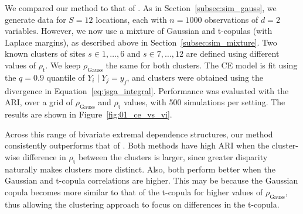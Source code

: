 \documentclass[12pt]{article}
\newcommand{\JSGa}{\mathop{\mathrm{JS}^{\mathrm{G}_{\lambda}}}\nolimits}
\newcommand{\rhou}[1]{\rho_{\text{#1}}}
\begin{document}
We compared our method to that of \citet{Vignotto2021}.
As in Section~\ref{subsec:sim_gauss}, we generate data for $S = 12$ locations, each with $n = 1000$ observations of $d = 2$ variables.
However, we now use a mixture of Gaussian and t-copulas (with Laplace margins), as described above in Section~\ref{subsec:sim_mixture}. 
Two known clusters of sites $s \in {1, \ldots, 6}$ and $s \in {7, \ldots, 12}$ are defined using different values of $\rhou{t}$. 
We keep $\rhou{Gauss}$ the same for both clusters.
The CE model is fit using the $q = 0.9$ quantile of $Y_{i} \mid Y_{j} = y_j$, and clusters were obtained using the divergence in Equation~\eqref{eq:jsga_integral}.
Performance was evaluated with the ARI, over a grid of $\rhou{Gauss}$ and $\rhou{t}$ values, with 500 simulations per setting.
The results are shown in Figure~\ref{fig:01_ce_vs_vi}. 

Across this range of bivariate extremal dependence structures, our method consistently outperforms that of \citet{Vignotto2021}. 
Both methods have high ARI when the cluster-wise difference in $\rhou{t}$ between the clusters is larger, since greater disparity naturally makes clusters more distinct. 
Also, both perform better when the Gaussian and t-copula correlations are higher.
This may be because the Gaussian copula becomes more similar to that of the t-copula for higher values of $\rhou{Gauss}$, thus allowing the clustering approach to focus on differences in the t-copula.
\end{document}
